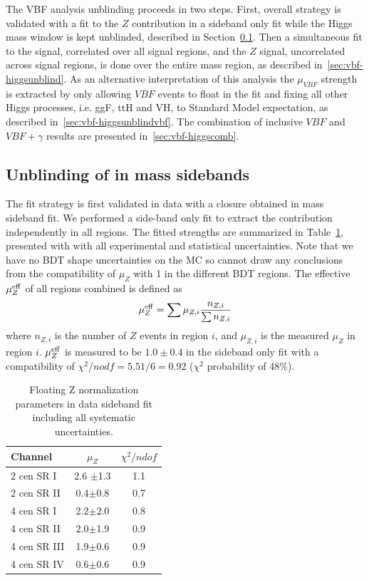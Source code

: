 The VBF \Hbb analysis unblinding proceeds in two steps. First, overall strategy is validated with a fit to the $Z$ contribution in a sideband only fit while the Higgs mass window is kept unblinded, described in Section~\ref{sec:vbf-zunblind}.  Then a simultaneous fit to the signal, correlated over all signal regions, and the $Z$ signal, uncorrelated across signal regions, is done over the entire mass region, as described in~\ref{sec:vbf-higgsunblind}. As an alternative interpretation of this analysis the $\mu_{VBF}$ strength is extracted by only allowing $VBF$ events to float in the fit and fixing all other Higgs processes, i.e. ggF, ttH and VH, to Standard Model expectation, as described in~\ref{sec:vbf-higgsunblindvbf}. The combination of inclusive $VBF$ and $VBF+\gamma$ results are presented in~\ref{sec:vbf-higgscomb}.


\subsection{Unblinding of \zjets{} in mass sidebands}
\label{sec:vbf-zunblind}

The fit strategy is first validated in data with a closure obtained in \zjets{} mass sideband fit. We performed a side-band only fit to extract the \zjets{} contribution independently in all regions. The fitted \zjets{} strengths are summarized in Table~\ref{tab:zsidebandfit}, presented with with all experimental and statistical uncertainties.   Note that we have no BDT shape uncertainties on the \zjets{} MC so cannot draw any conclusions from the compatibility of $\mu_Z$ with 1 in the different BDT regions. The effective $\mu_{Z}^{\rm eff}$ of all regions combined is defined as
\begin{equation}
\label{eqn:zsig}
\mu_{Z}^{\rm eff} = \sum \mu_{Z,i}\frac{n_{Z,i}}{\sum n_{Z,i}} 
\end{equation}
where $n_{Z,i}$ is the number of $Z$ events in region $i$, and $\mu_{Z,i}$ is the measured $\mu_Z$ in region $i$.  $\mu_{Z}^{\rm eff}$ is measured to be $1.0\pm 0.4$ in the sideband only fit with a compatibility of $\chi^2/nodf = 5.51/6=0.92$ ($\chi^2$ probability of 48\%).


\begin{table}[htbp]
\centering
\caption{Floating Z normalization parameters in data sideband fit including all systematic uncertainties.}
\label{tab:zsidebandfit}
\begin{tabular}{|l|c|c|}
\hline
Channel      & $\mu_{Z}$   & $\chi^2/ndof$ \\ \hline
2 cen SR I   & 2.6 $\pm$1.3  & 1.1          \\ \hline
2 cen SR II  & 0.4$\pm$0.8  & 0.7          \\ \hline
4 cen SR I   & 2.2$\pm$2.0  & 0.8          \\ \hline
4 cen SR II  & 2.0$\pm$1.9  & 0.9          \\ \hline
4 cen SR III & 1.9$\pm$0.6  & 0.9          \\ \hline
4 cen SR IV  & 0.6$\pm$0.6  & 0.9          \\ \hline
\end{tabular}
\end{table}



